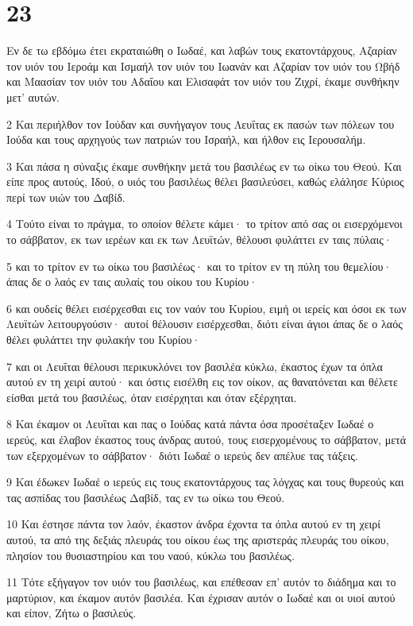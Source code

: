\chapter{23}

\par Εν δε τω εβδόμω έτει εκραταιώθη ο Ιωδαέ, και λαβών τους εκατοντάρχους, Αζαρίαν τον υιόν του Ιεροάμ και Ισμαήλ τον υιόν του Ιωανάν και Αζαρίαν τον υιόν του Ωβήδ και Μαασίαν τον υιόν του Αδαΐου και Ελισαφάτ τον υιόν του Ζιχρί, έκαμε συνθήκην μετ' αυτών.
\par 2 Και περιήλθον τον Ιούδαν και συνήγαγον τους Λευΐτας εκ πασών των πόλεων του Ιούδα και τους αρχηγούς των πατριών του Ισραήλ, και ήλθον εις Ιερουσαλήμ.
\par 3 Και πάσα η σύναξις έκαμε συνθήκην μετά του βασιλέως εν τω οίκω του Θεού. Και είπε προς αυτούς, Ιδού, ο υιός του βασιλέως θέλει βασιλεύσει, καθώς ελάλησε Κύριος περί των υιών του Δαβίδ.
\par 4 Τούτο είναι το πράγμα, το οποίον θέλετε κάμει· το τρίτον από σας οι εισερχόμενοι το σάββατον, εκ των ιερέων και εκ των Λευϊτών, θέλουσι φυλάττει εν ταις πύλαις·
\par 5 και το τρίτον εν τω οίκω του βασιλέως· και το τρίτον εν τη πύλη του θεμελίου· άπας δε ο λαός εν ταις αυλαίς του οίκου του Κυρίου·
\par 6 και ουδείς θέλει εισέρχεσθαι εις τον ναόν του Κυρίου, ειμή οι ιερείς και όσοι εκ των Λευϊτών λειτουργούσιν· αυτοί θέλουσιν εισέρχεσθαι, διότι είναι άγιοι άπας δε ο λαός θέλει φυλάττει την φυλακήν του Κυρίου·
\par 7 και οι Λευΐται θέλουσι περικυκλόνει τον βασιλέα κύκλω, έκαστος έχων τα όπλα αυτού εν τη χειρί αυτού· και όστις εισέλθη εις τον οίκον, ας θανατόνεται και θέλετε είσθαι μετά του βασιλέως, όταν εισέρχηται και όταν εξέρχηται.
\par 8 Και έκαμον οι Λευΐται και πας ο Ιούδας κατά πάντα όσα προσέταξεν Ιωδαέ ο ιερεύς, και έλαβον έκαστος τους άνδρας αυτού, τους εισερχομένους το σάββατον, μετά των εξερχομένων το σάββατον· διότι Ιωδαέ ο ιερεύς δεν απέλυε τας τάξεις.
\par 9 Και έδωκεν Ιωδαέ ο ιερεύς εις τους εκατοντάρχους τας λόγχας και τους θυρεούς και τας ασπίδας του βασιλέως Δαβίδ, τας εν τω οίκω του Θεού.
\par 10 Και έστησε πάντα τον λαόν, έκαστον άνδρα έχοντα τα όπλα αυτού εν τη χειρί αυτού, τα από της δεξιάς πλευράς του οίκου έως της αριστεράς πλευράς του οίκου, πλησίον του θυσιαστηρίου και του ναού, κύκλω του βασιλέως.
\par 11 Τότε εξήγαγον τον υιόν του βασιλέως, και επέθεσαν επ' αυτόν το διάδημα και το μαρτύριον, και έκαμον αυτόν βασιλέα. Και έχρισαν αυτόν ο Ιωδαέ και οι υιοί αυτού και είπον, Ζήτω ο βασιλεύς.
